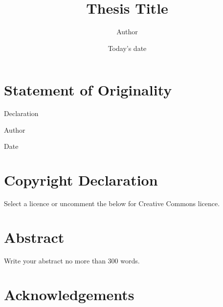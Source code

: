 \documentclass[12pt]{report}
\begin{document}
\title{Thesis Title}
\author{Author}
\date{Today's date} 

\maketitle
\newpage
{}
\setcounter{page}{2}
\chapter*{Statement of Originality}
Declaration

\hspace{5.5in} Author

\hspace{5.5in} Date



\chapter*{Copyright Declaration}
Select a licence or uncomment the below for Creative Commons licence.



\chapter*{Abstract}
Write your abstract no more than 300 words.

\chapter*{Acknowledgements}

\tableofcontents

\listoffigures
\listoftables






\clearpage
\begingroup
    \linespread{1}
    
\endgroup
\begin{appendices}

\end{appendices}
\end{document}
